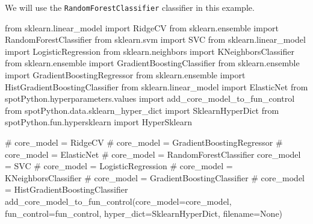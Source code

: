 \documentclass[
  letterpaper,
  DIV=11,
  numbers=noendperiod]{scrreprt}
\newenvironment{Shaded}{\begin{snugshade}}{\end{snugshade}}
\newcommand{\CommentTok}[1]{\textcolor[rgb]{0.37,0.37,0.37}{#1}}
\newcommand{\ImportTok}[1]{\textcolor[rgb]{0.00,0.46,0.62}{#1}}
\newcommand{\NormalTok}[1]{\textcolor[rgb]{0.00,0.23,0.31}{#1}}
\newcommand{\OperatorTok}[1]{\textcolor[rgb]{0.37,0.37,0.37}{#1}}
\newcommand{\VariableTok}[1]{\textcolor[rgb]{0.07,0.07,0.07}{#1}}
\begin{document}
We will use the \texttt{RandomForestClassifier} classifier in this
example.

\begin{Shaded}
\begin{Highlighting}[]
\ImportTok{from}\NormalTok{ sklearn.linear\_model }\ImportTok{import}\NormalTok{ RidgeCV}
\ImportTok{from}\NormalTok{ sklearn.ensemble }\ImportTok{import}\NormalTok{ RandomForestClassifier}
\ImportTok{from}\NormalTok{ sklearn.svm }\ImportTok{import}\NormalTok{ SVC}
\ImportTok{from}\NormalTok{ sklearn.linear\_model }\ImportTok{import}\NormalTok{ LogisticRegression}
\ImportTok{from}\NormalTok{ sklearn.neighbors }\ImportTok{import}\NormalTok{ KNeighborsClassifier}
\ImportTok{from}\NormalTok{ sklearn.ensemble }\ImportTok{import}\NormalTok{ GradientBoostingClassifier}
\ImportTok{from}\NormalTok{ sklearn.ensemble }\ImportTok{import}\NormalTok{ GradientBoostingRegressor}
\ImportTok{from}\NormalTok{ sklearn.ensemble }\ImportTok{import}\NormalTok{ HistGradientBoostingClassifier}
\ImportTok{from}\NormalTok{ sklearn.linear\_model }\ImportTok{import}\NormalTok{ ElasticNet}
\ImportTok{from}\NormalTok{ spotPython.hyperparameters.values }\ImportTok{import}\NormalTok{ add\_core\_model\_to\_fun\_control}
\ImportTok{from}\NormalTok{ spotPython.data.sklearn\_hyper\_dict }\ImportTok{import}\NormalTok{ SklearnHyperDict}
\ImportTok{from}\NormalTok{ spotPython.fun.hypersklearn }\ImportTok{import}\NormalTok{ HyperSklearn}
\end{Highlighting}
\end{Shaded}

\begin{Shaded}
\begin{Highlighting}[]
\CommentTok{\# core\_model  = RidgeCV}
\CommentTok{\# core\_model = GradientBoostingRegressor}
\CommentTok{\# core\_model = ElasticNet}
\CommentTok{\# core\_model = RandomForestClassifier}
\NormalTok{core\_model }\OperatorTok{=}\NormalTok{ SVC}
\CommentTok{\# core\_model = LogisticRegression}
\CommentTok{\# core\_model = KNeighborsClassifier}
\CommentTok{\# core\_model = GradientBoostingClassifier}
\CommentTok{\# core\_model = HistGradientBoostingClassifier}
\NormalTok{add\_core\_model\_to\_fun\_control(core\_model}\OperatorTok{=}\NormalTok{core\_model,}
\NormalTok{                              fun\_control}\OperatorTok{=}\NormalTok{fun\_control,}
\NormalTok{                              hyper\_dict}\OperatorTok{=}\NormalTok{SklearnHyperDict,}
\NormalTok{                              filename}\OperatorTok{=}\VariableTok{None}\NormalTok{)}
\end{Highlighting}
\end{Shaded}
\end{document}
